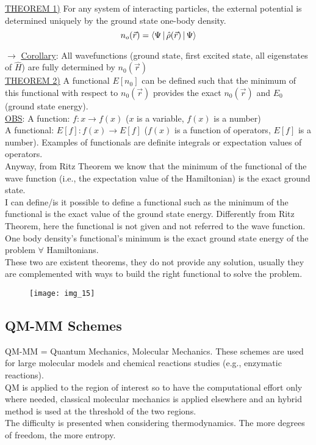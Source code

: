 \ul{THEOREM 1)} For any system of interacting particles, the external potential is determined uniquely by the ground state one-body density.
\[n_o(\vec{r})=\braket{\Psi\,|\,\hat{\rho}(\vec{r})\,|\,\Psi}\]

$\rightarrow\,\,$\ul{Corollary}: All wavefunctions (ground state, first excited state, all eigenstates of $\hat{H}$) are fully determined by $n_0(\vec{r})$\\

\ul{THEOREM 2)} A functional $E[n_0]$ can be defined such that the minimum of this functional with respect to $n_0(\vec{r})$ provides the exact $n_0(\vec{r})$ and $E_0$ (ground state energy).\\

\ul{OBS}: A function: $f: x \rightarrow f(x)$ ($x$ is a variable, $f(x)$ is a number)\\
A functional: $E[f]: f(x) \rightarrow E[f]$ ($f(x)$ is a function of operators, $E[f]$ is a number). Examples of functionals are definite integrals or expectation values of operators.\\
Anyway, from Ritz Theorem we know that the minimum of the functional of the wave function (i.e., the expectation value of the Hamiltonian) is the exact ground state.\\

I can define/is it possible to define a functional such as the minimum of the functional is the exact value of the ground state energy. Differently from Ritz Theorem, here the functional is not given and not referred to the wave function. One body density's functional's minimum is the exact ground state energy of the problem $\forall$ Hamiltonians.\\

These two are existent theorems, they do not provide any solution, usually they are complemented with ways to build the right functional to solve the problem.\\
\begin{figure}[htbp!]
	\centering
	\texttt{[image: img\_15]}
\end{figure}

\subsection{QM-MM Schemes}
QM-MM = Quantum Mechanics, Molecular Mechanics. These schemes are used for large molecular models and chemical reactions studies (e.g., enzymatic reactions).\\
QM is applied to the region of interest so to have the computational effort only where needed, classical molecular mechanics is applied elsewhere and an hybrid method is used at the threshold of the two regions.\\
The difficulty is presented when considering thermodynamics. The more degrees of freedom, the more entropy.\\

